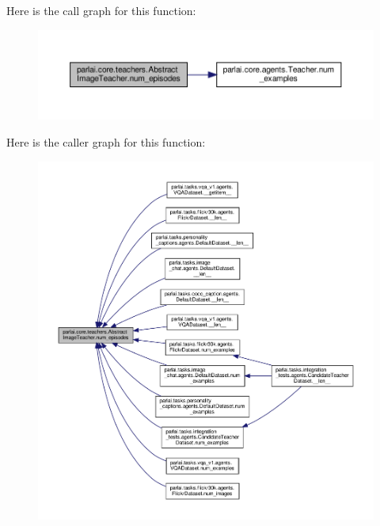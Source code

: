 Here is the call graph for this function\+:
\nopagebreak
\begin{figure}[H]
\begin{center}
\leavevmode
\includegraphics[width=350pt]{classparlai_1_1core_1_1teachers_1_1AbstractImageTeacher_a702999efa941a59854ee511fc99cd117_cgraph}
\end{center}
\end{figure}
Here is the caller graph for this function\+:
\nopagebreak
\begin{figure}[H]
\begin{center}
\leavevmode
\includegraphics[width=350pt]{classparlai_1_1core_1_1teachers_1_1AbstractImageTeacher_a702999efa941a59854ee511fc99cd117_icgraph}
\end{center}
\end{figure}
\mbox{\label{classparlai_1_1core_1_1teachers_1_1AbstractImageTeacher_a4f5565f49b0aef6d084257b5090a7e40}} 
